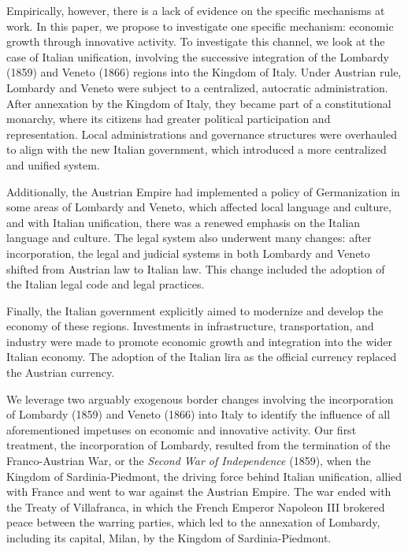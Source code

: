 Empirically, however, there is a lack of evidence on the specific mechanisms at work. In this paper, we propose to investigate one specific mechanism: economic growth through innovative activity. To investigate this channel, we look at the case of Italian unification, involving the successive integration of the Lombardy (1859) and Veneto (1866) regions into the Kingdom of Italy. Under Austrian rule, Lombardy and Veneto were subject to a centralized, autocratic administration. After annexation by the Kingdom of Italy, they became part of a constitutional monarchy, where its citizens had greater political participation and representation. Local administrations and governance structures were overhauled to align with the new Italian government, which introduced a more centralized and unified system.

Additionally, the Austrian Empire had implemented a policy of Germanization in some areas of Lombardy and Veneto, which affected local language and culture, and with Italian unification, there was a renewed emphasis on the Italian language and culture. The legal system also underwent many changes: after incorporation, the legal and judicial systems in both Lombardy and Veneto shifted from Austrian law to Italian law. This change included the adoption of the Italian legal code and legal practices.

Finally, the Italian government explicitly aimed to modernize and develop the economy of these regions. Investments in infrastructure, transportation, and industry were made to promote economic growth and integration into the wider Italian economy. The adoption of the Italian lira as the official currency replaced the Austrian currency.

We leverage two arguably exogenous border changes involving the incorporation of Lombardy (1859) and Veneto (1866) into Italy to identify the influence of all aforementioned impetuses on economic and innovative activity. Our first treatment, the incorporation of Lombardy, resulted from the termination of the Franco-Austrian War, or the \textit{Second War of Independence} (1859), when the Kingdom of Sardinia-Piedmont, the driving force behind Italian unification, allied with France and went to war against the Austrian Empire. The war ended with the Treaty of Villafranca, in which the French Emperor Napoleon III brokered peace between the warring parties, which led to the annexation of Lombardy, including its capital, Milan, by the Kingdom of Sardinia-Piedmont.

